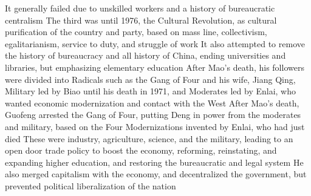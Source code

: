 \documentclass[11 pt, twoside]{article}
\newenvironment{outline*}
{
	\begin{outline}[enumerate]
	}
	{\end{outline}
}
\begin{document}
\begin{outline*}
\3 It generally failed due to unskilled workers and a history of bureaucratic centralism
\2 The third was until 1976, the Cultural Revolution, as cultural purification of the country and party, based on mass line, collectivism, egalitarianism, service to duty, and struggle of work
\3 It also attempted to remove the history of bureaucracy and all history of China, ending universities and libraries, but emphasizing elementary education
\3 After Mao's death, his followers were divided into Radicals such as the Gang of Four and his wife, Jiang Qing, Military led by Biao until his death in 1971, and Moderates led by Enlai, who wanted economic modernization and contact with the West
\2 After Mao's death, Guofeng arrested the Gang of Four, putting Deng in power from the moderates and military, based on the Four Modernizations invented by Enlai, who had just died
\3 These were industry, agriculture, science, and the military, leading to an open door trade policy to boost the economy, reforming, reinstating, and expanding higher education, and restoring the bureaucratic and legal system
\3 He also merged capitalism with the economy, and decentralized the government, but prevented political liberalization of the nation
\end{outline*}
\end{document}
